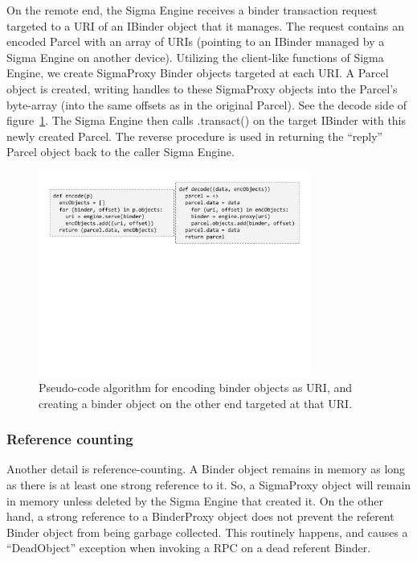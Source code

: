 \documentclass[prodmode]{acmlarge}
\begin{document}
On the remote end, the Sigma Engine receives a binder transaction request targeted to a URI of an IBinder object that it manages. The request contains an encoded Parcel with an array of URIs (pointing to an IBinder managed by a Sigma Engine on another device). Utilizing the client-like functions of Sigma Engine, we create SigmaProxy Binder objects targeted at each URI. A Parcel object is created, writing handles to these SigmaProxy objects into the Parcel's byte-array (into the same offsets as in the original Parcel). See the decode side of figure~\ref{fig:encodeParcel}. The Sigma Engine then calls .transact() on the target IBinder with this newly created Parcel. The reverse procedure is used in returning the ``reply'' Parcel object back to the caller Sigma Engine.

\begin{figure}[h]
\centering
\includegraphics[width=0.8\textwidth]{drawings/encodeObjects.pdf}
\caption{Pseudo-code algorithm for encoding binder objects as URI, and creating a binder object on the other end targeted at that URI.}
\label{fig:encodeParcel}
\end{figure}

\subsubsection{Reference counting}
\label{sec:ReferenceCounting}
Another detail is reference-counting. A Binder object remains in memory as long as there is at least one strong reference to it. So, a SigmaProxy object will remain in memory unless deleted by the Sigma Engine that created it. On the other hand, a strong reference to a BinderProxy object does not prevent the referent Binder object from being garbage collected. This routinely happens, and causes a ``DeadObject'' exception when invoking a RPC on a dead referent Binder.
\end{document}
